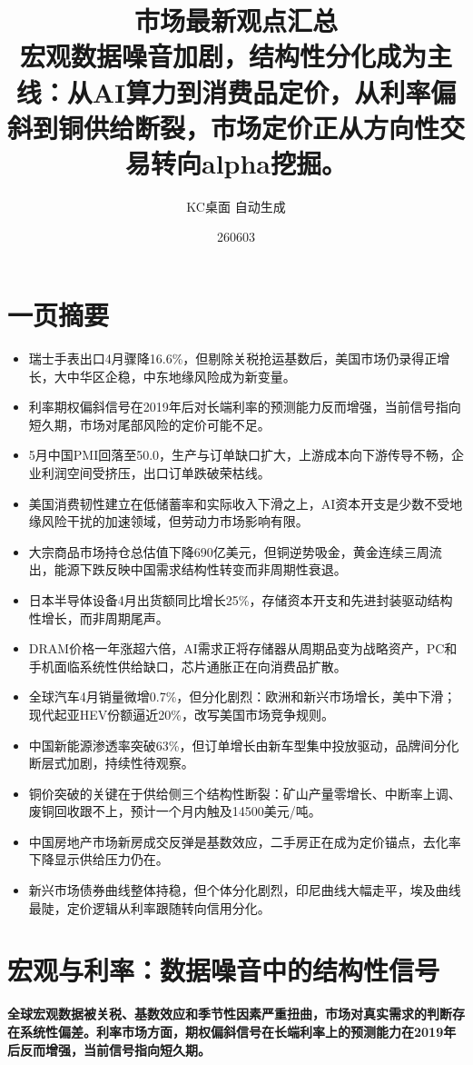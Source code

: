 \documentclass[11pt]{ctexart}
\title{\textbf{市场最新观点汇总}\\[0.4em]{\large 宏观数据噪音加剧，结构性分化成为主线：从AI算力到消费品定价，从利率偏斜到铜供给断裂，市场定价正从方向性交易转向alpha挖掘。}}
\author{KC桌面 自动生成}
\date{260603}
\begin{document}
\maketitle
\tableofcontents
\newpage
\section{一页摘要}
\begin{itemize}
  \item 瑞士手表出口4月骤降16.6\%，但剔除关税抢运基数后，美国市场仍录得正增长，大中华区企稳，中东地缘风险成为新变量。
  \item 利率期权偏斜信号在2019年后对长端利率的预测能力反而增强，当前信号指向短久期，市场对尾部风险的定价可能不足。
  \item 5月中国PMI回落至50.0，生产与订单缺口扩大，上游成本向下游传导不畅，企业利润空间受挤压，出口订单跌破荣枯线。
  \item 美国消费韧性建立在低储蓄率和实际收入下滑之上，AI资本开支是少数不受地缘风险干扰的加速领域，但劳动力市场影响有限。
  \item 大宗商品市场持仓总估值下降690亿美元，但铜逆势吸金，黄金连续三周流出，能源下跌反映中国需求结构性转变而非周期性衰退。
  \item 日本半导体设备4月出货额同比增长25\%，存储资本开支和先进封装驱动结构性增长，而非周期尾声。
  \item DRAM价格一年涨超六倍，AI需求正将存储器从周期品变为战略资产，PC和手机面临系统性供给缺口，芯片通胀正在向消费品扩散。
  \item 全球汽车4月销量微增0.7\%，但分化剧烈：欧洲和新兴市场增长，美中下滑；现代起亚HEV份额逼近20\%，改写美国市场竞争规则。
  \item 中国新能源渗透率突破63\%，但订单增长由新车型集中投放驱动，品牌间分化断层式加剧，持续性待观察。
  \item 铜价突破的关键在于供给侧三个结构性断裂：矿山产量零增长、中断率上调、废铜回收跟不上，预计一个月内触及14500美元/吨。
  \item 中国房地产市场新房成交反弹是基数效应，二手房正在成为定价锚点，去化率下降显示供给压力仍在。
  \item 新兴市场债券曲线整体持稳，但个体分化剧烈，印尼曲线大幅走平，埃及曲线最陡，定价逻辑从利率跟随转向信用分化。
\end{itemize}
\section{宏观与利率：数据噪音中的结构性信号}
\textbf{全球宏观数据被关税、基数效应和季节性因素严重扭曲，市场对真实需求的判断存在系统性偏差。利率市场方面，期权偏斜信号在长端利率上的预测能力在2019年后反而增强，当前信号指向短久期。}
\end{document}
